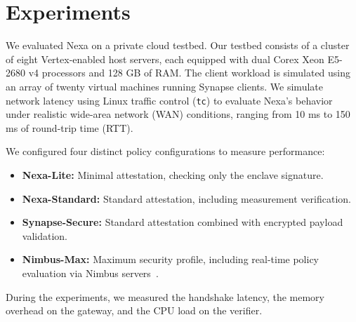 \section{Experiments}
\label{sec:experiments}
We evaluated Nexa on a private cloud testbed. Our testbed consists of a cluster of eight Vertex-enabled host servers, each equipped with dual Corex Xeon E5-2680 v4 processors and 128 GB of RAM. The client workload is simulated using an array of twenty virtual machines running Synapse clients. We simulate network latency using Linux traffic control (\texttt{tc}) to evaluate Nexa's behavior under realistic wide-area network (WAN) conditions, ranging from 10 ms to 150 ms of round-trip time (RTT).

We configured four distinct policy configurations to measure performance:
\begin{itemize}
    \item \textbf{Nexa-Lite:} Minimal attestation, checking only the enclave signature.
    \item \textbf{Nexa-Standard:} Standard attestation, including measurement verification.
    \item \textbf{Synapse-Secure:} Standard attestation combined with encrypted payload validation.
    \item \textbf{Nimbus-Max:} Maximum security profile, including real-time policy evaluation via Nimbus servers~\cite{martin2024nimbus}.
\end{itemize}

During the experiments, we measured the handshake latency, the memory overhead on the gateway, and the CPU load on the verifier.
